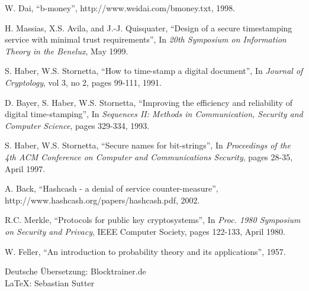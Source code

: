 \documentclass[10pt]{article}
\begin{document}
	\begin{thebibliography}{8}
	
		W. Dai, \enquote{b-money}, http://www.weidai.com/bmoney.txt, 1998.
		
		H. Massias, X.S. Avila, and J.-J. Quisquater, \enquote{Design of a secure timestamping service with minimal trust requirements}, In \emph{20th Symposium on Information Theory in the Benelux}, May 1999.
		
		S. Haber, W.S. Stornetta, \enquote{How to time-stamp a digital document}, In \emph{Journal of Cryptology}, vol 3, no 2, pages 99-111, 1991.
		
		D. Bayer, S. Haber, W.S. Stornetta, \enquote{Improving the efficiency and reliability of digital time-stamping}, In \emph{Sequences II: Methods in Communication, Security and Computer Science}, pages 329-334, 1993.
		
		S. Haber, W.S. Stornetta, \enquote{Secure names for bit-strings}, In \emph{Proceedings of the 4th ACM Conference on Computer and Communications Security}, pages 28-35, April 1997.
		
		A. Back, \enquote{Hashcash - a denial of service counter-measure}, \\http://www.hashcash.org/papers/hashcash.pdf, 2002.
		
		R.C. Merkle, \enquote{Protocols for public key cryptosystems}, In \emph{Proc. 1980 Symposium on Security and Privacy}, IEEE Computer Society, pages 122-133, April 1980.
		
		W. Feller, \enquote{An introduction to probability theory and its applications}, 1957.
	\end{thebibliography}
	
	\vfill
	\begin{center}
		\scriptsize{Deutsche Übersetzung: Blocktrainer.de\\ \smallskip \LaTeX: Sebastian Sutter}
	\end{center}
\end{document}
